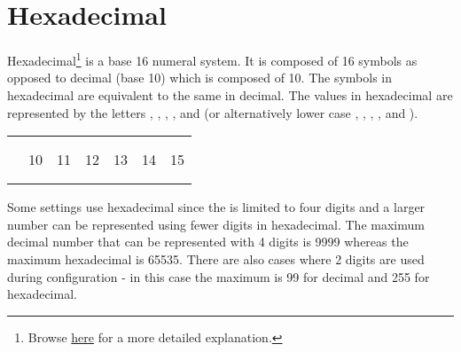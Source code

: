 \chapter{Hexadecimal} \label{Hexadecimal}

Hexadecimal\footnote{Browse \href{https://en.wikipedia.org/wiki/Hexadecimal}{here}
for a more detailed explanation.} is a base \num{16} numeral system.  It is
composed of \num{16} symbols as opposed to decimal (base \num{10}) which is
composed of \num{10}. The symbols  in hexadecimal are equivalent to
the same in decimal.  The values  in hexadecimal are represented by
the letters , , , ,  and  (or
alternatively lower case , , , ,  and
).

\begin{table}[H]
  \begin{tabu}{ X[3,l,m] X[1,c,m] X[1,c,m] X[1,c,m] X[1,c,m] X[1,c,m] X[1,c,m] }
    \thrule
     \\ \mdrule

      & 
      & 
      & 
      & 
      & 
      & 
    \\ \mrule
      & \num{10}
      & \num{11}
      & \num{12}
      & \num{13}
      & \num{14}
      & \num{15}
    \\ \mrule
      & 
      & 
      & 
      & 
      & 
      & 
    \\ \mrule
  \end{tabu}
\end{table}

Some settings use hexadecimal since the  is limited to four digits
and a larger number can be represented using fewer digits in hexadecimal. The
maximum decimal number that can be represented with \num{4} digits is
\num{9999} whereas the maximum hexadecimal is \num{65535}.  There are also
cases where \num{2} digits are used during configuration - in this case the
maximum is \num{99} for decimal and \num{255} for hexadecimal.

